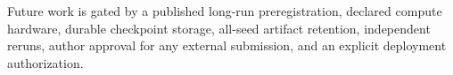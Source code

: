 \documentclass[11pt]{article}
\begin{document}
Future work is gated by a published long-run preregistration, declared compute hardware, durable checkpoint storage, all-seed artifact retention, independent reruns, author approval for any external submission, and an explicit deployment authorization.



\end{document}
